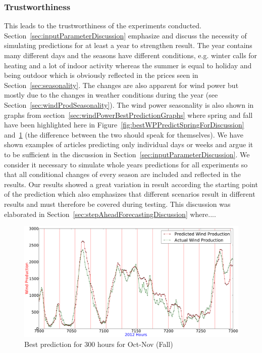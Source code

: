 \subsubsection{Trustworthiness}
This leads to the trustworthiness of the experiments conducted. Section~\ref{sec:inputParameterDiscussion} emphasize and discuss the necessity of simulating predictions for at least a year to strengthen result. The year contains many different days and the seasons have different conditions, e.g. winter calls for heating and a lot of indoor activity whereas the summer is equal to holiday and being outdoor which is obviously reflected in the prices seen in Section~\ref{sec:seasonality}. The changes are also apparent for wind power but mostly due to the changes in weather conditions during the year (see Section~\ref{sec:windProdSeasonality}). The wind power seasonality is also shown in graphs from section~\ref{sec:windPowerBestPredictionGraphs} where spring and fall have been highlighted here in Figure~\ref{fig:bestWPPredictSpringForDiscussion} and~\ref{fig:bestPredictWPFallForDiscussion} (the difference between the two should speak for themselves). We have shown examples of articles predicting only individual days or weeks and argue it to be sufficient in the discussion in Section~\ref{sec:inputParameterDiscussion}. We consider it necessary to simulate whole years predictions for all experiments so that all conditional changes of every season are included and reflected in the results. Our results showed a great variation in result according the starting point of the prediction which also emphasizes that different scenarios result in different results and must therefore be covered during testing. This discussion was elaborated in Section~\ref{sec:stepAheadForecastingDiscussion} where....  

\begin{figure}[H]
\centering
\includegraphics[width=0.99\linewidth]{billeder/bestPossiblePredictionWindProduction7000-7300_Fall.png}
\caption{Best prediction for 300 hours for Oct-Nov (Fall)}
\label{fig:bestPredictWPFallForDiscussion}
\end{figure}

